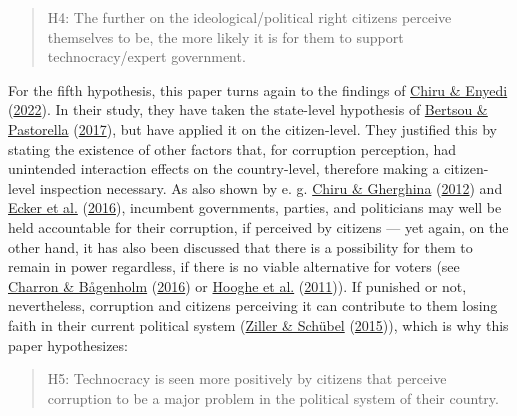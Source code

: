 \documentclass[
  12pt,
  english,
]{article}
\begin{document}
\begin{quote}
H4: The further on the ideological/political right citizens perceive
themselves to be, the more likely it is for them to support
technocracy/expert government.
\end{quote}

For the fifth hypothesis, this paper turns again to the findings of
\protect\hyperlink{ref-chiru2022wants}{Chiru \& Enyedi}
(\protect\hyperlink{ref-chiru2022wants}{2022}). In their study, they
have taken the state-level hypothesis of
\protect\hyperlink{ref-bertsou2017technocratic}{Bertsou \& Pastorella}
(\protect\hyperlink{ref-bertsou2017technocratic}{2017}), but have
applied it on the citizen-level. They justified this by stating the
existence of other factors that, for corruption perception, had
unintended interaction effects on the country-level, therefore making a
citizen-level inspection necessary. As also shown by e. g.
\protect\hyperlink{ref-chiru2012voter}{Chiru \& Gherghina}
(\protect\hyperlink{ref-chiru2012voter}{2012}) and
\protect\hyperlink{ref-ecker2016corruption}{Ecker et al.}
(\protect\hyperlink{ref-ecker2016corruption}{2016}), incumbent
governments, parties, and politicians may well be held accountable for
their corruption, if perceived by citizens --- yet again, on the other
hand, it has also been discussed that there is a possibility for them to
remain in power regardless, if there is no viable alternative for voters
(see \protect\hyperlink{ref-charron2016ideology}{Charron \& Bågenholm}
(\protect\hyperlink{ref-charron2016ideology}{2016}) or
\protect\hyperlink{ref-hooghe2011distrusting}{Hooghe et al.}
(\protect\hyperlink{ref-hooghe2011distrusting}{2011})). If punished or
not, nevertheless, corruption and citizens perceiving it can contribute
to them losing faith in their current political system
(\protect\hyperlink{ref-ziller2015pure}{Ziller \& Schübel}
(\protect\hyperlink{ref-ziller2015pure}{2015})), which is why this paper
hypothesizes:

\begin{quote}
H5: Technocracy is seen more positively by citizens that perceive
corruption to be a major problem in the political system of their
country.
\end{quote}
\end{document}
